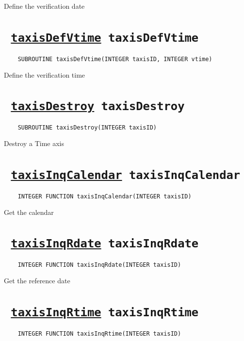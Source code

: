 Define the verification date
\ifpdfoutput{}{(\ref{taxisDefVdate})}


\section*{\texttt{ 
\ifpdf
\hyperref[taxisDefVtime]{taxisDefVtime}
\else
taxisDefVtime
\fi
}}
\begin{verbatim}
    SUBROUTINE taxisDefVtime(INTEGER taxisID, INTEGER vtime)
\end{verbatim}

Define the verification time
\ifpdfoutput{}{(\ref{taxisDefVtime})}


\section*{\texttt{ 
\ifpdf
\hyperref[taxisDestroy]{taxisDestroy}
\else
taxisDestroy
\fi
}}
\begin{verbatim}
    SUBROUTINE taxisDestroy(INTEGER taxisID)
\end{verbatim}

Destroy a Time axis
\ifpdfoutput{}{(\ref{taxisDestroy})}


\section*{\texttt{ 
\ifpdf
\hyperref[taxisInqCalendar]{taxisInqCalendar}
\else
taxisInqCalendar
\fi
}}
\begin{verbatim}
    INTEGER FUNCTION taxisInqCalendar(INTEGER taxisID)
\end{verbatim}

Get the calendar
\ifpdfoutput{}{(\ref{taxisInqCalendar})}


\section*{\texttt{ 
\ifpdf
\hyperref[taxisInqRdate]{taxisInqRdate}
\else
taxisInqRdate
\fi
}}
\begin{verbatim}
    INTEGER FUNCTION taxisInqRdate(INTEGER taxisID)
\end{verbatim}

Get the reference date
\ifpdfoutput{}{(\ref{taxisInqRdate})}


\section*{\texttt{ 
\ifpdf
\hyperref[taxisInqRtime]{taxisInqRtime}
\else
taxisInqRtime
\fi
}}
\begin{verbatim}
    INTEGER FUNCTION taxisInqRtime(INTEGER taxisID)
\end{verbatim}

